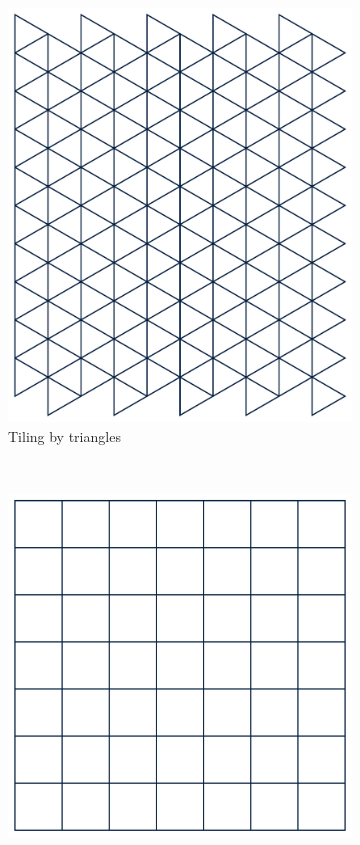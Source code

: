 \documentclass[
  oneside,
  11pt, a4paper,
  footinclude=true,
  headinclude=true,
  cleardoublepage=empty
]{scrbook}
\begin{document}
\begin{figure}[H]
        \centering
        \begin{subfigure}[b]{0.3\textwidth}
                \includegraphics[width=\textwidth]{triangle}
                \caption{Tiling by triangles}
                \label{fig:triangle}
        \end{subfigure}\hfill%
        ~ %
        \begin{subfigure}[b]{0.35\textwidth}
                \includegraphics[width=\textwidth]{square}

\end{subfigure}
\end{figure}
\end{document}
